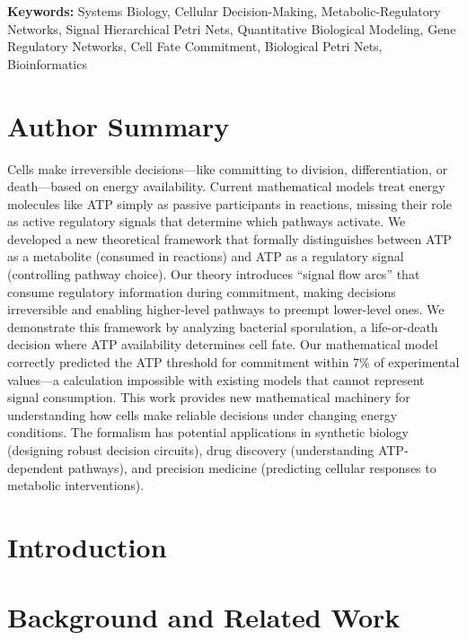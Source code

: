 \documentclass[10pt,letterpaper]{article}
\begin{document}
\vspace{6pt}
\noindent\textbf{Keywords:} Systems Biology, Cellular Decision-Making, Metabolic-Regulatory Networks, Signal Hierarchical Petri Nets, Quantitative Biological Modeling, Gene Regulatory Networks, Cell Fate Commitment, Biological Petri Nets, Bioinformatics

\section*{Author Summary}
Cells make irreversible decisions---like committing to division, differentiation, or death---based on energy availability. Current mathematical models treat energy molecules like ATP simply as passive participants in reactions, missing their role as active regulatory signals that determine which pathways activate. We developed a new theoretical framework that formally distinguishes between ATP as a metabolite (consumed in reactions) and ATP as a regulatory signal (controlling pathway choice). Our theory introduces ``signal flow arcs'' that consume regulatory information during commitment, making decisions irreversible and enabling higher-level pathways to preempt lower-level ones. We demonstrate this framework by analyzing bacterial sporulation, a life-or-death decision where ATP availability determines cell fate. Our mathematical model correctly predicted the ATP threshold for commitment within 7\% of experimental values---a calculation impossible with existing models that cannot represent signal consumption. This work provides new mathematical machinery for understanding how cells make reliable decisions under changing energy conditions. The formalism has potential applications in synthetic biology (designing robust decision circuits), drug discovery (understanding ATP-dependent pathways), and precision medicine (predicting cellular responses to metabolic interventions).

\section{Introduction}



\section{Background and Related Work}
\end{document}
